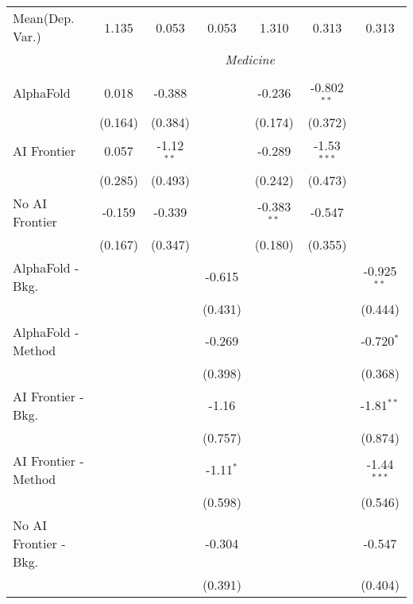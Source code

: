 \begin{tabular}{lcccccc}
Mean(Dep. Var.) & 1.135 & 0.053 & 0.053 & 1.310 & 0.313 & 0.313 \\
 & \multicolumn{6}{c}{\textit{Medicine}} \\ \\
   AlphaFold               & 0.018   & -0.388       &             & -0.236        & -0.802$^{**}$ &   \\   
                           & (0.164) & (0.384)      &             & (0.174)       & (0.372)       &   \\   
   AI Frontier             & 0.057   & -1.12$^{**}$ &             & -0.289        & -1.53$^{***}$ &   \\   
                           & (0.285) & (0.493)      &             & (0.242)       & (0.473)       &   \\   
   No AI Frontier          & -0.159  & -0.339       &             & -0.383$^{**}$ & -0.547        &   \\   
                           & (0.167) & (0.347)      &             & (0.180)       & (0.355)       &   \\   
   AlphaFold - Bkg.        &         &              & -0.615      &               &               & -0.925$^{**}$\\   
                           &         &              & (0.431)     &               &               & (0.444)\\   
   AlphaFold - Method      &         &              & -0.269      &               &               & -0.720$^{*}$\\   
                           &         &              & (0.398)     &               &               & (0.368)\\   
   AI Frontier - Bkg.      &         &              & -1.16       &               &               & -1.81$^{**}$\\   
                           &         &              & (0.757)     &               &               & (0.874)\\   
   AI Frontier - Method    &         &              & -1.11$^{*}$ &               &               & -1.44$^{***}$\\   
                           &         &              & (0.598)     &               &               & (0.546)\\   
   No AI Frontier - Bkg.   &         &              & -0.304      &               &               & -0.547\\   
                           &         &              & (0.391)     &               &               & (0.404)\\   

\end{tabular}
